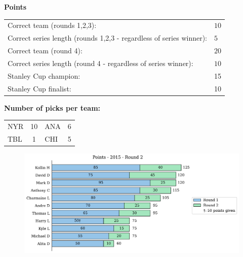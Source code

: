 \documentclass[10pt]{article}
\begin{document}
{\bf Points}\\
\begin{minipage}{12cm}
    \begin{tabular}{l l}
        Correct team (rounds 1,2,3):	& $10$\\
        Correct series length (rounds 1,2,3 - regardless of series winner):	& $5$\\
        Correct team (round 4):	& $20$\\
        Correct series length (round 4 - regardless of series winner):	& $10$\\
        Stanley Cup champion:	& 15\\
        Stanley Cup finalist:	& 10\\
    \end{tabular}

    \vspace{1cm}
    {\bf Number of picks per team:}\\
    \begin{tabular}{lc | lc }
        NYR & 10 & ANA & 6 \\
        TBL & 1 & CHI & 5 \\
    \end{tabular}
\end{minipage}
\begin{minipage}[t]{13cm}
    \begin{figure}[H]
        \vspace{-2.5cm}
        \includegraphics[width=13cm]{../../figures/2015/Points-2015-Round2.pdf}
    \end{figure}
\end{minipage}
\end{document}
